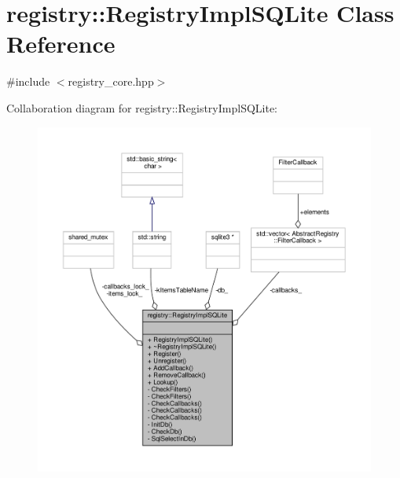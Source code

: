 \hypertarget{classregistry_1_1RegistryImplSQLite}{}\section{registry\+:\+:Registry\+Impl\+S\+Q\+Lite Class Reference}
\label{classregistry_1_1RegistryImplSQLite}


{\ttfamily \#include $<$registry\+\_\+core.\+hpp$>$}



Collaboration diagram for registry\+:\+:Registry\+Impl\+S\+Q\+Lite\+:
\nopagebreak
\begin{figure}[H]
\begin{center}
\leavevmode
\includegraphics[width=350pt]{classregistry_1_1RegistryImplSQLite__coll__graph}
\end{center}
\end{figure}
